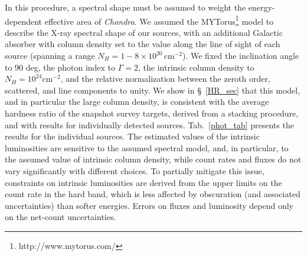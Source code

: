 \documentclass[useAMS,usenatbib]{mnras}
\newcommand*{\nhunits}{\mathrm{cm^{-2}}}
\begin{document}
In this procedure, a spectral shape must be assumed to weight the energy-dependent effective area of \textit{Chandra}. We assumed the MYTorus\footnote{http://www.mytorus.com/} model \citep{Murphy09} to describe the X-ray spectral shape of our sources, with an additional Galactic absorber with column density set to the value along the line of sight of each source (spanning a range \mbox{$N_H=1-8\times10^{20}\,\nhunits$}). We fixed the inclination angle to $90$ deg, the photon index to $\Gamma=2$, the intrinsic column density to $N_H=10^{24}\nhunits$,  and the relative normalization between the zeroth order, scattered, and line components to unity. We show in \S~\ref{HR_sec} that this model, and in particular the large column density, is consistent with the average hardness ratio of the snapshot survey targets, derived from a stacking procedure, and with results for individually detected sources.
Tab.~\ref{phot_tab} presents the results for the individual sources. The estimated values of the intrinsic luminosities are sensitive to the assumed spectral model, and, in particular, to the assumed value of intrinsic column density, while count rates and fluxes do not vary significantly with different choices. To partially mitigate this issue, constraints on intrinsic luminosities are derived from the upper limits on the count rate in the hard band, which is less affected by obscuration (and associated uncertainties) than softer energies. Errors on fluxes and luminosity depend only on the net-count uncertainties.
\end{document}
